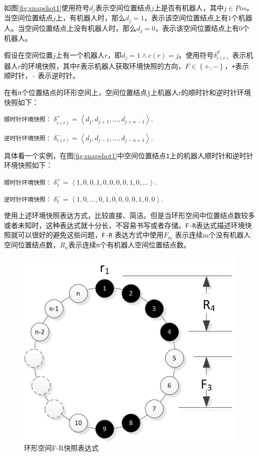 如图\ref{fig:snapshot1}使用符号$d_j$表示空间位置结点$j$上是否有机器人，其中$j \in Pos $。当空间位置结点$j$上，有机器人时，那么$d_j = 1$，表示该空间位置结点上有$1$个机器人。当空间位置结点上没有机器人时，那么$d_j = 0$，表示该空间位置结点上有$0$个机器人。

假设在空间位置$j$上有一个机器人$r$，即$ d_j = 1 \land c\left(r\right) = j$。使用符号$\delta_{c\left(r\right)}^F$ 表示机器人$r$的环境快照，其中\verb|F|表示机器人获取环境快照的方向，$F \in \left\{+,-\right\}$，\verb|+|表示顺时针，\verb|-| 表示逆时针。

在有\verb|n|个位置结点的环形空间上，空间位置结点\verb|j|上机器人r的顺时针和逆时针环境快照如下：

\verb|顺时针环境快照：| $\delta_{c\left(r\right)}^+ = \left\langle d_j,d_{j+1},...,d_{j+n-1}  \right\rangle.$

\verb|逆时针环境快照：| $\delta_{c\left(r\right)}^- = \left\langle d_j,d_{j-1},...,d_{j-n+1}  \right\rangle.$

具体看一个实例，在图\ref{fig:snapshot1}中空间位置结点\verb|1|上的机器人顺时针和逆时针环境快照如下：

\verb|顺时针环境快照：| $\delta_1^+ = \left\langle 1,0,0,1,0,0,0,0,1,0,... \right\rangle.$

\verb|逆时针环境快照：| $\delta_1^- = \left\langle 1,0,...,0,1,0,0,0,0,1,0,0 \right\rangle.$

使用上述环境快照表达方式，比较直接、简洁。但是当环形空间中位置结点数较多或者未知时，这种表达式就十分长，不容易书写或者存储。\verb|F-R|表达式\cite{r5}描述环境快照就可以很好的避免这些问题，\verb|F-R| 表达方式中使用$F_m$ 表示连续m个没有机器人空间位置结点数，$R_n$表示连续\verb|n|个有机器人空间位置结点数。

\begin{figure}[!hbt]
	\centering
	\includegraphics[width=3.5 in]{fig/frsnapshot.png}
	\caption{环形空间F-R快照表达式}
	\label{fig:frsnapshot}
\end{figure}

